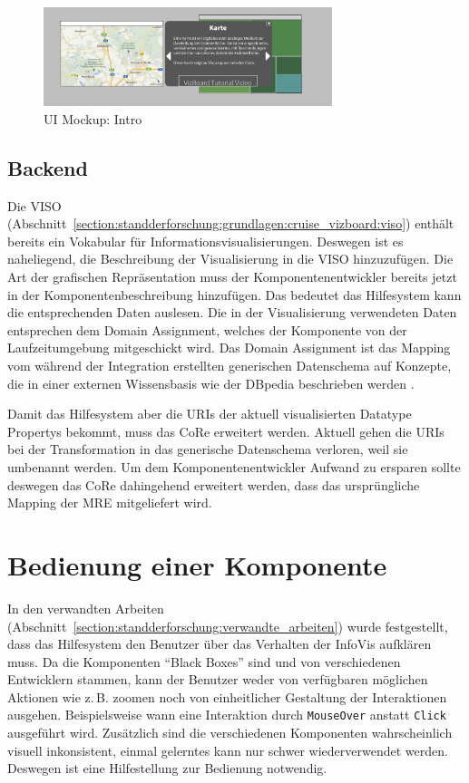 \documentclass[
	headsepline,
	footsepline,
	fontsize=12pt,
	bibliography=totoc
]{scrbook}
\begin{document}
\begin{figure}[htbp]
   \centering
   \includegraphics[width=0.75\textwidth]{images/konzeption-ueberblick.png}
   \caption{UI Mockup: Intro}
   \label{figure:ueberblick}
\end{figure}

\subsection{Backend}
\label{section:konzeption:intro:backend}

Die VISO (Abschnitt~\ref{section:standderforschung:grundlagen:cruise_vizboard:viso}) enthält bereits ein Vokabular für Informationsvisualisierungen. Deswegen ist es naheliegend, die Beschreibung der Visualisierung in die VISO hinzuzufügen. Die Art der grafischen Repräsentation muss der Komponentenentwickler bereits jetzt in der Komponentenbeschreibung hinzufügen. Das bedeutet das Hilfesystem kann die entsprechenden Daten auslesen. Die in der Visualisierung verwendeten Daten entsprechen dem Domain Assignment, welches der Komponente von der Laufzeitumgebung mitgeschickt wird. Das Domain Assignment ist das Mapping vom während der Integration erstellten generischen Datenschema auf Konzepte, die in einer externen Wissensbasis wie der DBpedia beschrieben werden \cite{Voigt2012a}.


Damit das Hilfesystem aber die URIs der aktuell visualisierten Datatype Propertys bekommt, muss das CoRe erweitert werden. Aktuell gehen die URIs bei der Transformation in das generische Datenschema verloren, weil sie umbenannt werden. Um dem Komponentenentwickler Aufwand zu ersparen sollte deswegen das CoRe dahingehend erweitert werden, dass das ursprüngliche Mapping der MRE mitgeliefert wird.


\section{Bedienung einer Komponente}
\label{section:konzeption:bedienung}

In den verwandten Arbeiten (Abschnitt~\ref{section:standderforschung:verwandte_arbeiten}) wurde festgestellt, dass das Hilfesystem den Benutzer über das Verhalten der InfoVis aufklären muss. Da die Komponenten \enquote{Black Boxes} sind und von verschiedenen Entwicklern stammen, kann der Benutzer weder von verfügbaren möglichen Aktionen wie z.\,B. zoomen noch von einheitlicher Gestaltung der Interaktionen ausgehen. Beispielsweise wann eine Interaktion durch \texttt{MouseOver} anstatt \texttt{Click} ausgeführt wird. Zusätzlich sind die verschiedenen Komponenten wahrscheinlich visuell inkonsistent, einmal gelerntes kann nur schwer wiederverwendet werden. Deswegen ist eine Hilfestellung zur Bedienung notwendig.
\end{document}
